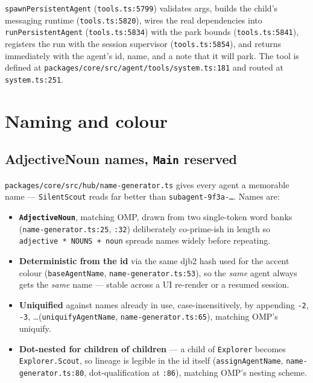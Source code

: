 \documentclass[11pt]{article}
\begin{document}
\texttt{spawnPersistentAgent} (\texttt{tools.ts:5799}) validates args, builds the
child's messaging runtime (\texttt{tools.ts:5820}), wires the real dependencies
into \texttt{runPersistentAgent} (\texttt{tools.ts:5834}) with the park bounds
(\texttt{tools.ts:5841}), registers the run with the session supervisor
(\texttt{tools.ts:5854}), and returns immediately with the agent's id, name, and a
note that it will park. The tool is defined at
\texttt{packages/core/src/agent/tools/system.ts:181} and routed at
\texttt{system.ts:251}.

\section{Naming and colour}

\subsection{AdjectiveNoun names, \texttt{Main} reserved}

\texttt{packages/core/src/hub/name-generator.ts} gives every agent a memorable
name --- \texttt{SilentScout} reads far better than \texttt{subagent-9f3a-\ldots}.
Names are:

\begin{itemize}[leftmargin=*]
  \item \textbf{\texttt{AdjectiveNoun}}, matching OMP, drawn from two single-token
  word banks (\texttt{name-generator.ts:25}, \texttt{:32}) deliberately
  co-prime-ish in length so \texttt{adjective * NOUNS + noun} spreads names widely
  before repeating.
  \item \textbf{Deterministic from the id} via the same djb2 hash used for the
  accent colour (\texttt{baseAgentName}, \texttt{name-generator.ts:53}), so the
  \textit{same} agent always gets the \textit{same} name --- stable across a UI
  re-render or a resumed session.
  \item \textbf{Uniquified} against names already in use, case-insensitively, by
  appending \texttt{-2}, \texttt{-3}, \ldots (\texttt{uniquifyAgentName},
  \texttt{name-generator.ts:65}), matching OMP's uniquify.
  \item \textbf{Dot-nested for children of children} --- a child of
  \texttt{Explorer} becomes \texttt{Explorer.Scout}, so lineage is legible in the
  id itself (\texttt{assignAgentName}, \texttt{name-generator.ts:80},
  dot-qualification at \texttt{:86}), matching OMP's nesting scheme.
\end{itemize}
\end{document}
